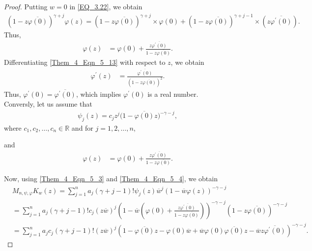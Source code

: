\documentclass[12pt, reqno]{amsart}
\theoremstyle{definition}
\theoremstyle{remark}
\numberwithin{equation}{section}
\begin{document}
\begin{proof}
	Putting $w=0$ in \eqref{EQ_3.22}, we obtain
	\begin{align*}
	(1-z\overline{\varphi(0)})^{\gamma+j}\varphi(z)
=(1- z\overline{\varphi(0)})^{\gamma+j}\times\varphi(0)
	+(1-z\overline{\varphi(0)})^{\gamma+j-1}\times(z\overline{\varphi^\prime(0)}).
	\end{align*} 
	Thus,
	\begin{align}\label{Them_4_Eqn_5_13}
	\varphi(z)&=\varphi(0)+\frac{z\overline{\varphi^\prime(0)}}{1-z\overline{\varphi(0)}}.	
	\end{align}
	Differentiating \eqref{Them_4_Eqn_5_13} with respect to $z$, we obtain
			\begin{align}\label{Them_4_Eqn_5_14}
	\varphi^\prime(z)&=\frac{\overline{\varphi^\prime(0)}}{(1-z\overline{\varphi(0)})^2}.	
	\end{align}
	Thus, $	\varphi^\prime(0)=\overline{\varphi^\prime(0)}$, which implies $\varphi^\prime(0)$ is a real number.\\
	
	
	Conversly, let us assume that  
	\begin{gather*}
	\psi_j(z)=c_jz^{j}\big(1-\overline{\varphi(0)} z\big)^{-\gamma-j},
	\end{gather*}
	where $c_1, c_2, \dots, c_n \in \mathbb{R}$ and for $j=1, 2, \dots, n$,

	and
	\begin{align*}
	\varphi(z)&=\varphi(0)+\frac{z\overline{\varphi^\prime(0)}}{1-z\overline{\varphi(0)}}.	
	\end{align*}
	
	
	
	
	
	Now, using \eqref{Them_4_Eqn_5_3} and \eqref{Them_4_Eqn_5_4}, we obtain
	\begin{align}\label{Them_4_Eqn_5_11}
	&M_{n,\psi, \varphi}K_w(z)
	=\displaystyle\sum_{j=1}^{n}a_j(\gamma+j-1)! \psi_j(z)\overline{w}^{j}(1- \overline{w}\varphi(z))^{-\gamma-j}\nonumber\\
		&=\displaystyle\sum_{j=1}^{n}a_j(\gamma+j-1)! c_j(z\overline{w})^{j}\left(1-\overline{w}\left(\varphi(0)+\frac{z\overline{\varphi^\prime(0)}}{1-z\overline{\varphi(0)}}\right)\right)^{-\gamma-j}(1- z\overline{\varphi(0)})^{-\gamma-j}\nonumber\\
	&=\displaystyle\sum_{j=1}^{n}a_jc_j(\gamma+j-1)! (z\overline{w})^{j}\left(1-\overline{\varphi(0)}z-\varphi(0)\overline{w}+\overline{w}\varphi(0)\overline{\varphi(0)}z-\overline{w}z\overline{\varphi^\prime(0)}\right)^{-\gamma-j}.
	\end{align}


\end{proof}
\end{document}
